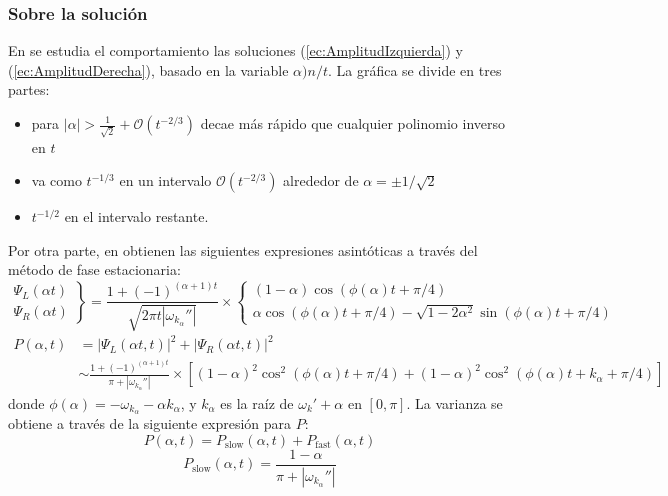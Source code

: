 \begin{appendix}
\subsubsection{Sobre la solución}
En \cite{nayak2000quantum} se estudia el comportamiento las soluciones (\ref{ec:AmplitudIzquierda}) y (\ref{ec:AmplitudDerecha}), basado en la variable $\alpha)n/t$. La gráfica se divide en tres partes:
\begin{itemize}
    \item para $|\alpha|>\frac{1}{\sqrt{2}}+\mathcal{O}(t^{-2/3})$ decae más rápido que cualquier polinomio inverso en $t$ 
    \item va como $t^{-1/3}$ en un intervalo $\mathcal{O}(t^{-2/3})$ alrededor de $\alpha=\pm 1/\sqrt{2}$
    \item $t^{-1/2}$ en el intervalo restante.
\end{itemize}
Por otra parte, en \cite{nayak2000quantum} obtienen las siguientes expresiones asintóticas a través del método de fase estacionaria:
\begin{equation}
\left.
\begin{array}{cc}
    \Psi_L(\alpha t) \\
    \Psi_R(\alpha t) 
\end{array}{}    
\right\}
= \frac{1+(-1)^{(\alpha+1)t}}{\sqrt{2\pi t|\omega_{k_\alpha}''|}}\times
\left\{
\begin{array}{ll}
     (1-\alpha) \cos{(\phi(\alpha)t+\pi/4)}\\
    \alpha\cos{(\phi(\alpha)t+\pi/4)}-\sqrt{1-2\alpha^2}\sin{(\phi(\alpha)t+\pi/4)}
\end{array}{}
\right.
\end{equation}
\begin{align}
    P(\alpha,t)&=|\Psi_L(\alpha t,t)|^2+|\Psi_R(\alpha t,t)|^2\\
    &\sim\frac{1+(-1)^{(\alpha+1)t}}{\pi+|\omega_{k_\alpha}''|}\times[(1-\alpha)^2\cos^2{(\phi(\alpha)t+\pi/4)}+(1-\alpha)^2\cos^2{(\phi(\alpha)t+k_\alpha+\pi/4)} ]
\end{align}{}
donde $\phi(\alpha)=-\omega_{k_\alpha}-\alpha k_\alpha$, y $k_\alpha$ es la raíz de $\omega_k'+\alpha$ en $[0,\pi]$.
La varianza se obtiene a través de la siguiente expresión para $P$:
\begin{equation}
P(\alpha,t)=P_{\mbox{slow}}(\alpha,t)+P_{\mbox{fast}}(\alpha,t)
\end{equation}{}
\begin{equation}
P_{\mbox{slow}}(\alpha,t)=\frac{1-\alpha}{\pi+|\omega_{k_\alpha}''|}

\end{equation}
\end{appendix}
